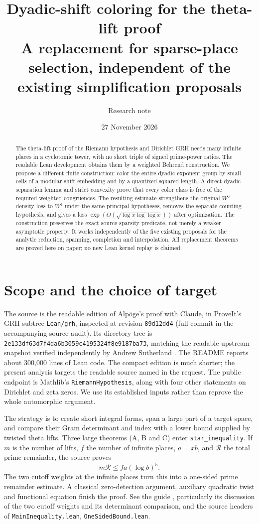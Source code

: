 \documentclass[11pt]{article}
\title{\textbf{Dyadic-shift coloring for the theta-lift proof}\\[4pt]\large A replacement for sparse-place selection, independent of the existing simplification proposals}
\author{Research note}
\date{27 November 2026}
\theoremstyle{remark}\newtheorem{remark}[theorem]{Remark}
\newcommand{\src}[1]{\texttt{#1}}
\begin{document}
\maketitle
\begin{abstract}
The theta-lift proof of the Riemann hypothesis and Dirichlet GRH needs many infinite places in a cyclotomic tower, with no short triple of signed prime-power ratios. The readable Lean development obtains them by a weighted Behrend construction. We propose a different finite construction: color the entire dyadic exponent group by small cells of a modular-shift embedding and by a quantized squared length. A direct dyadic separation lemma and strict convexity prove that every color class is free of the required weighted congruences. The resulting estimate strengthens the original $W^6$ density loss to $W^4$ under the same principal hypotheses, removes the separate counting hypothesis, and gives a loss $\exp(O(\sqrt{\log x\log\log x}))$ after optimization. The construction preserves the exact source sparsity predicate, not merely a weaker asymptotic property. It works independently of the five existing proposals for the analytic reduction, spanning, completion and interpolation. All replacement theorems are proved here on paper; no new Lean kernel replay is claimed.
\end{abstract}
\tableofcontents

\section{Scope and the choice of target}
The source is the readable edition of Alp\"oge's proof with Claude, in ProveIt's GRH subtree \src{Lean/grh}, inspected at revision \src{89d12dd4} (full commit in the accompanying source audit). Its directory tree is \src{2e133df63d7f4da6b3059c4195324f8e9187ba73}, matching the readable upstream snapshot verified independently by Andrew Sutherland \cite{verification}. The README reports about 300,000 lines of Lean code. The compact edition is much shorter; the present analysis targets the readable source named in the request. The public endpoint is Mathlib's \src{RiemannHypothesis}, along with four other statements on Dirichlet and zeta zeros. We use its established inputs rather than reprove the whole automorphic argument.

The strategy is to create short integral forms, span a large part of a target space, and compare their Gram determinant and index with a lower bound supplied by twisted theta lifts. Three large theorems (A, B and C) enter \src{star\_inequality}. If $m$ is the number of lifts, $f$ the number of infinite places, $a=xb$, and $\mathcal R$ the total prime remainder, the source proves
\begin{equation}\label{eq:star}
 m\mathcal R\le fa(\log b)^5.
\end{equation}
The two cutoff weights at the infinite places turn this into a one-sided prime remainder estimate. A classical zero-detection argument, auxiliary quadratic twist and functional equation finish the proof. See the guide \cite{guide}, particularly its discussion of the two cutoff weights and its determinant comparison, and the source headers of \src{MainInequality.lean}, \src{OneSidedBound.lean}.
\end{document}
